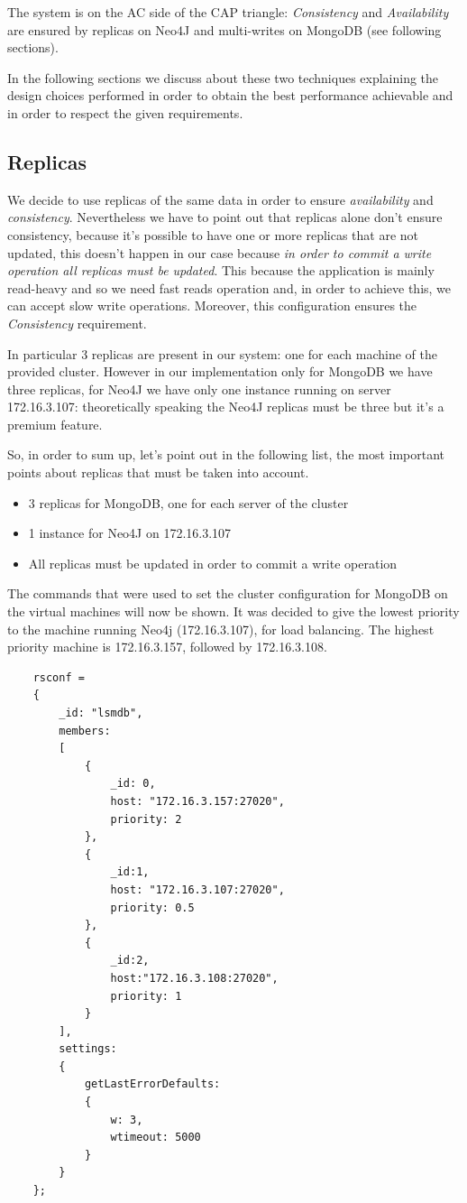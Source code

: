 \documentclass[a4paper]{report}
\begin{document}
\noindent The system is on the AC side of the CAP triangle: \emph{Consistency} and \emph{Availability} are ensured by replicas on Neo4J and multi-writes on MongoDB (see following sections). 

\noindent In the following sections we discuss about these two techniques explaining the design choices performed in order to obtain the best performance achievable and in order to respect the given requirements. 

\subsection{Replicas}
We decide to use replicas of the same data in order to ensure \emph{availability} and \emph{consistency}. Nevertheless we have to point out that replicas alone don't ensure consistency, because it's possible to have one or more replicas that are not updated, this doesn't happen in our case because \emph{in order to commit a write operation all replicas must be updated}. This because the application is mainly read-heavy and so we need fast reads operation and, in order to achieve this, we can accept slow write operations. Moreover, this configuration ensures the \emph{Consistency} requirement.

\noindent \noindent In particular 3 replicas are present in our system: one for each machine of the provided cluster. However in our implementation only for MongoDB we have three replicas, for Neo4J we have only one instance running on server 172.16.3.107: theoretically speaking the Neo4J replicas must be three but it's a premium feature.

\noindent So, in order to sum up, let's point out in the following list, the most important points about replicas that must be taken into account.
\begin{itemize}
	\item 3 replicas for MongoDB, one for each server of the cluster
	\item 1 instance for Neo4J on 172.16.3.107
	\item All replicas must be updated in order to commit a write operation
\end{itemize}

\noindent The commands that were used to set the cluster configuration for MongoDB on the virtual machines will now be shown. It was decided to give the lowest priority to the machine running Neo4j (172.16.3.107), for load balancing. The highest priority machine is 172.16.3.157, followed by 172.16.3.108.
\begin{lstlisting}
	rsconf = 
	{
		_id: "lsmdb", 
		members: 
		[
			{
				_id: 0, 
				host: "172.16.3.157:27020", 
				priority: 2
			}, 
			{
				_id:1, 
				host: "172.16.3.107:27020", 
				priority: 0.5
			}, 
			{
				_id:2, 
				host:"172.16.3.108:27020", 
				priority: 1
			}
		], 
		settings: 
		{
			getLastErrorDefaults: 
			{
				w: 3, 
				wtimeout: 5000
			}
		}
	};	
\end{lstlisting} 
\end{document}
